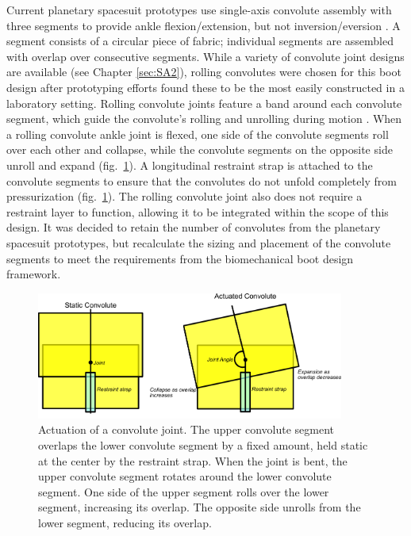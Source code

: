 \documentclass[defaultstyle,11pt]{thesis}
\begin{document}
Current planetary spacesuit prototypes use single-axis convolute assembly with three segments to provide ankle flexion/extension, but not inversion/eversion \citep{Ross2002}.
A segment consists of a circular piece of fabric; individual segments are assembled with overlap over consecutive segments.
While a variety of convolute joint designs are available (see Chapter \ref{sec:SA2}), rolling convolutes were chosen for this boot design after prototyping efforts found these to be the most easily constructed in a laboratory setting.
Rolling convolute joints feature a band around each convolute segment, which guide the convolute's rolling and unrolling during motion \citep{Harris2001}.
When a rolling convolute ankle joint is flexed, one side of the convolute segments roll over each other and collapse, while the convolute segments on the opposite side unroll and expand (fig.~\ref{fig:SA3-convolute_actuation}).
A longitudinal restraint strap is attached to the convolute segments to ensure that the convolutes do not unfold completely from pressurization (fig.~\ref{fig:SA3-convolute_actuation}).
The rolling convolute joint also does not require a restraint layer to function, allowing it to be integrated within the scope of this design.
It was decided to retain the number of convolutes from the planetary spacesuit prototypes, but recalculate the sizing and placement of the convolute segments to meet the requirements from the biomechanical boot design framework.

\begin{figure}
\hypertarget{fig:SA3-convolute_actuation}{%
\centering
\includegraphics[width=0.9\textwidth,height=\textheight]{../fig/SA3/Convolute_Actuation.png}
\caption{Actuation of a convolute joint. The upper convolute segment overlaps the lower convolute segment by a fixed amount, held static at the center by the restraint strap. When the joint is bent, the upper convolute segment rotates around the lower convolute segment. One side of the upper segment rolls over the lower segment, increasing its overlap. The opposite side unrolls from the lower segment, reducing its overlap.}\label{fig:SA3-convolute_actuation}
}
\end{figure}
\end{document}
